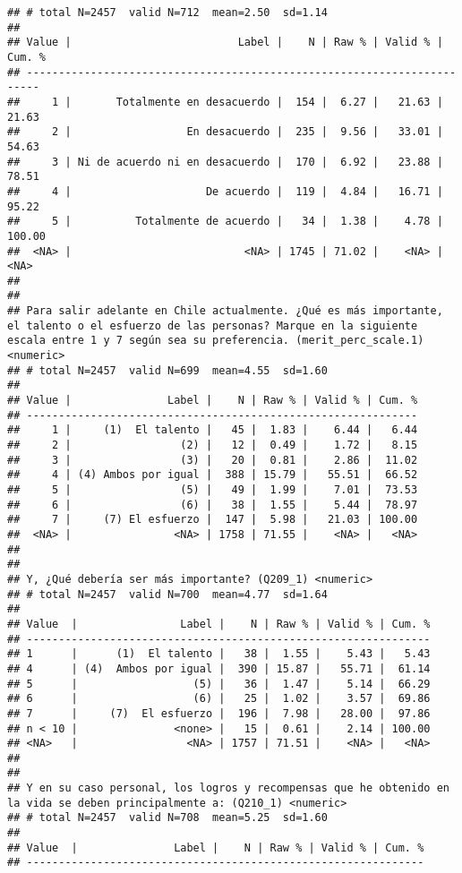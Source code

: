 \documentclass[
  10,
  landscape,
  legalpaper]{article}
\begin{document}
\begin{verbatim}
## # total N=2457  valid N=712  mean=2.50  sd=1.14
## 
## Value |                          Label |    N | Raw % | Valid % | Cum. %
## ------------------------------------------------------------------------
##     1 |       Totalmente en desacuerdo |  154 |  6.27 |   21.63 |  21.63
##     2 |                  En desacuerdo |  235 |  9.56 |   33.01 |  54.63
##     3 | Ni de acuerdo ni en desacuerdo |  170 |  6.92 |   23.88 |  78.51
##     4 |                     De acuerdo |  119 |  4.84 |   16.71 |  95.22
##     5 |          Totalmente de acuerdo |   34 |  1.38 |    4.78 | 100.00
##  <NA> |                           <NA> | 1745 | 71.02 |    <NA> |   <NA>
## 
## 
## Para salir adelante en Chile actualmente. ¿Qué es más importante, el talento o el esfuerzo de las personas? Marque en la siguiente escala entre 1 y 7 según sea su preferencia. (merit_perc_scale.1) <numeric>
## # total N=2457  valid N=699  mean=4.55  sd=1.60
## 
## Value |               Label |    N | Raw % | Valid % | Cum. %
## -------------------------------------------------------------
##     1 |     (1)  El talento |   45 |  1.83 |    6.44 |   6.44
##     2 |                 (2) |   12 |  0.49 |    1.72 |   8.15
##     3 |                 (3) |   20 |  0.81 |    2.86 |  11.02
##     4 | (4) Ambos por igual |  388 | 15.79 |   55.51 |  66.52
##     5 |                 (5) |   49 |  1.99 |    7.01 |  73.53
##     6 |                 (6) |   38 |  1.55 |    5.44 |  78.97
##     7 |     (7) El esfuerzo |  147 |  5.98 |   21.03 | 100.00
##  <NA> |                <NA> | 1758 | 71.55 |    <NA> |   <NA>
## 
## 
## Y, ¿Qué debería ser más importante? (Q209_1) <numeric>
## # total N=2457  valid N=700  mean=4.77  sd=1.64
## 
## Value  |                Label |    N | Raw % | Valid % | Cum. %
## ---------------------------------------------------------------
## 1      |      (1)  El talento |   38 |  1.55 |    5.43 |   5.43
## 4      | (4)  Ambos por igual |  390 | 15.87 |   55.71 |  61.14
## 5      |                  (5) |   36 |  1.47 |    5.14 |  66.29
## 6      |                  (6) |   25 |  1.02 |    3.57 |  69.86
## 7      |     (7)  El esfuerzo |  196 |  7.98 |   28.00 |  97.86
## n < 10 |               <none> |   15 |  0.61 |    2.14 | 100.00
## <NA>   |                 <NA> | 1757 | 71.51 |    <NA> |   <NA>
## 
## 
## Y en su caso personal, los logros y recompensas que he obtenido en la vida se deben principalmente a: (Q210_1) <numeric>
## # total N=2457  valid N=708  mean=5.25  sd=1.60
## 
## Value  |               Label |    N | Raw % | Valid % | Cum. %
## --------------------------------------------------------------

\end{verbatim}
\end{document}
